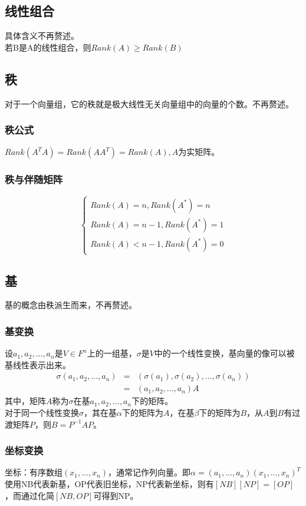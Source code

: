 \documentclass[UTF8]{ctexart}
\begin{document}
\subsection{线性组合}
具体含义不再赘述。\\
\indent
若B是A的线性组合，则$Rank(A)\geq Rank(B)$
\subsection{秩}
对于一个向量组，它的秩就是极大线性无关向量组中的向量的个数。不再赘述。
\subsubsection{秩公式}
$Rank(A^{T}A)=Rank(AA^{T})=Rank(A),A$为实矩阵。
\subsubsection{秩与伴随矩阵}
\begin{equation*}
    \left\{
        \begin{array}{c}
            Rank(A)=n,Rank(A^{*})=n\\
            Rank(A)=n-1,Rank(A^{*})=1\\
            Rank(A)<n-1,Rank(A^{*})=0
        \end{array}
    \right.
\end{equation*}
\subsection{基}
基的概念由秩派生而来，不再赘述。
\subsubsection{基变换}
设$a_1,a_2,...,a_n$是$V \in F^{n}$上的一组基，$\sigma$是$V$中的一个线性变换，基向量的像可以被基线性表示出来。
\begin{eqnarray*}
    \sigma(a_1,a_2,...,a_n) & = & (\sigma(a_1),\sigma(a_2),...,\sigma(a_n))    \\
    & = &(a_1,a_2,...,a_n)A
\end{eqnarray*}
其中，矩阵$A$称为$\sigma$在基$a_1,a_2,...,a_n$下的矩阵。\\
\indent
对于同一个线性变换$\sigma$，其在基$\alpha$下的矩阵为$\mathit{A}$，在基$\beta$下的矩阵为$\mathit{B}$，从$\mathit{A}$到$\mathit{B}$有过渡矩阵$\mathit{P}$，则$\mathit{B}=\mathit{P^{-1}AP}$。
\subsubsection{坐标变换}
坐标：有序数组$(x_1,...,x_n)$，通常记作列向量。即$\alpha=(a_1,...,a_n)(x_1,...,x_n)^T$\\
\indent
使用NB代表新基，OP代表旧坐标，NP代表新坐标，则有$[NB][NP]=[OP]$，而通过化简$[NB,OP]$可得到NP。
\end{document}
